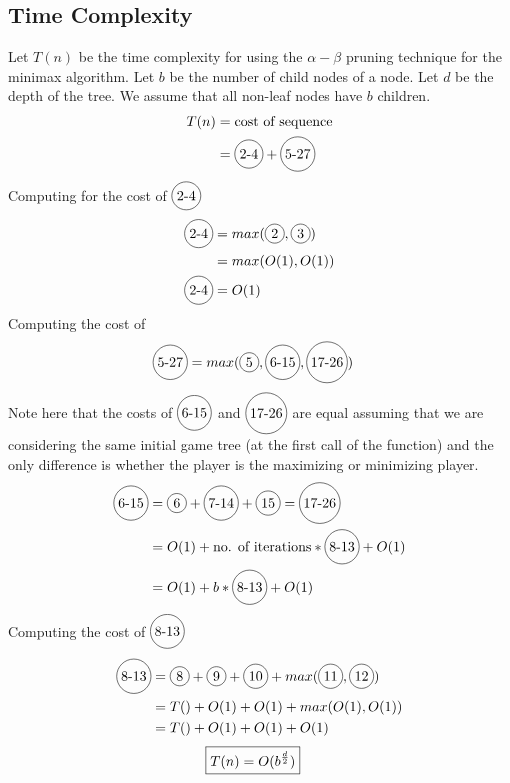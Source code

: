 \documentclass[12pt]{article}%
\newcommand*\circled[1]{\tikz[baseline=(char.base)]{
            \node[shape=circle,draw,inner sep=2pt] (char) {#1};}}
\begin{document}
  \subsection{Time Complexity \cite{cis}}
    Let $T(n)$ be the time complexity for using the $\alpha - \beta$ pruning technique for the minimax algorithm. Let $b$ be the number of child nodes of a node. Let $d$ be the depth of the tree. We assume that all non-leaf nodes have $b$ children. 
    \begin{align*}
      T(n) &= \text{cost of sequence} \\ 
      &= \circled{2-4} + \circled{5-27}
    \end{align*}
    Computing for the cost of $\circled{2-4}$
    \begin{align*}
      \circled{2-4} &= max(\circled{2}, \circled{3}) \\ 
      &= max(O(1), O(1)) \\ 
      \circled{2-4} &= O(1)
    \end{align*}
    Computing the cost of \circled{5-27}
    \begin{align*}
      \circled{5-27} &= max(\circled{5}, \circled{6-15}, \circled{17-26}) 
    \end{align*}
    Note here that the costs of $\circled{6-15}$ and $\circled{17-26}$ are equal assuming that we are considering the same initial game tree (at the first call of the function) and the only difference is whether the player is the maximizing or minimizing player. 
    \begin{align*}
      \circled{6-15} &= \circled{6} + \circled{7-14} + \circled{15} = \circled{17-26} \\
      &= O(1) + \text{no. of iterations} * \circled{8-13} + O(1) \\ 
      &= O(1) + b * \circled{8-13} + O(1) \\ 
    \end{align*}
    Computing the cost of $\circled{8-13}$
    \begin{align*}
      \circled{8-13} &= \circled{8} + \circled{9} + \circled{10} + max(\circled{11}, \circled{12}) \\
      &= T() + O(1) + O(1) + max(O(1),O(1)) \\ 
      &= T() + O(1) + O(1) + O(1)
    \end{align*}
    \begin{align*}
      \Aboxed{T(n) &= O(b^{\frac{d}{2}})}
    \end{align*}
\end{document}
